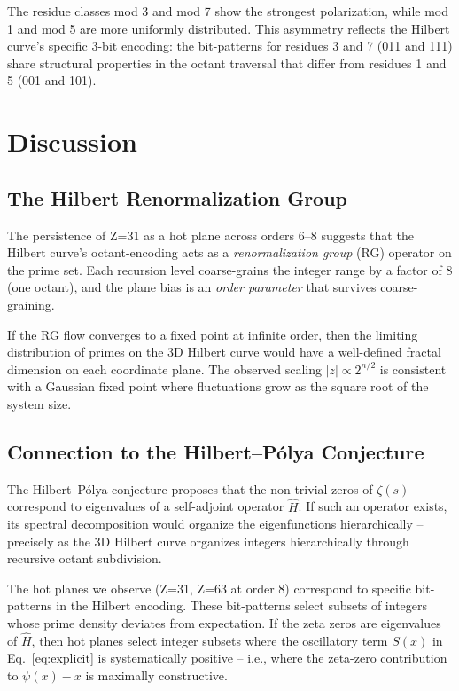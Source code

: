 \documentclass[11pt,a4paper]{article}
\begin{document}
The residue classes mod 3 and mod 7 show the strongest polarization,
while mod 1 and mod 5 are more uniformly distributed. This asymmetry
reflects the Hilbert curve's specific 3-bit encoding: the bit-patterns
for residues 3 and 7 (011 and 111) share structural properties in the
octant traversal that differ from residues 1 and 5 (001 and 101).

\section{Discussion}

\subsection{The Hilbert Renormalization Group}

The persistence of Z=31 as a hot plane across orders 6--8 suggests that
the Hilbert curve's octant-encoding acts as a \emph{renormalization group}
(RG) operator on the prime set. Each recursion level coarse-grains the
integer range by a factor of 8 (one octant), and the plane bias is an
\emph{order parameter} that survives coarse-graining.

If the RG flow converges to a fixed point at infinite order, then the
limiting distribution of primes on the 3D Hilbert curve would have a
well-defined fractal dimension on each coordinate plane. The observed
scaling $|z| \propto 2^{n/2}$ is consistent with a Gaussian fixed point
where fluctuations grow as the square root of the system size.

\subsection{Connection to the Hilbert--P\'{o}lya Conjecture}

The Hilbert--P\'{o}lya conjecture proposes that the non-trivial zeros of
$\zeta(s)$ correspond to eigenvalues of a self-adjoint operator $\hat{H}$.
If such an operator exists, its spectral decomposition would organize the
eigenfunctions hierarchically -- precisely as the 3D Hilbert curve organizes
integers hierarchically through recursive octant subdivision.

The hot planes we observe (Z=31, Z=63 at order 8) correspond to specific
bit-patterns in the Hilbert encoding. These bit-patterns select subsets of
integers whose prime density deviates from expectation. If the zeta zeros
are eigenvalues of $\hat{H}$, then hot planes select integer subsets where
the oscillatory term $S(x)$ in Eq.~\ref{eq:explicit} is systematically
positive -- i.e., where the zeta-zero contribution to $\psi(x) - x$ is
maximally constructive.
\end{document}
